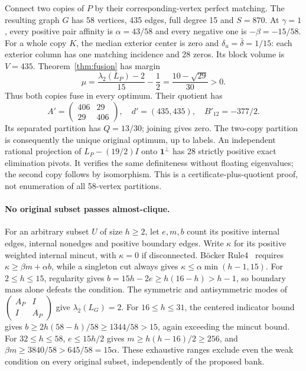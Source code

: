 \documentclass[sigconf,anonymous,review]{acmart}
\newcommand{\1}{\mathbf{1}}
\begin{document}
Connect two copies of $P$ by their corresponding-vertex perfect matching.
The resulting graph $G$ has 58 vertices, 435 edges, full degree 15 and
$S=870$. At $\gamma=1$, every positive pair affinity is
$\alpha=43/58$ and every negative one is $-\beta=-15/58$.
For a whole copy $K$, the median exterior center is zero and
$\delta_u=\bar\delta=1/15$: each exterior column has one matching incidence
and 28 zeros. Its block volume is $V=435$. Theorem~\ref{thm:fusion} has margin
\[
 \mu=\frac{\lambda_2(L_P)-2}{15}-\frac12
     =\frac{10-\sqrt{29}}{30}>0.
\]
Thus both copies fuse in every optimum. Their quotient has
\[
 A'=\begin{pmatrix}406&29\\29&406\end{pmatrix},\quad
 d'=(435,435),\quad B'_{12}=-377/2.
\]
Its separated partition has $Q=13/30$; joining gives zero. The two-copy
partition is consequently the unique original optimum, up to labels.
An independent rational projection of $L_P-(19/2)I$ onto $\1^\perp$
has 28 strictly positive exact elimination pivots. It verifies the same
definiteness without floating eigenvalues; the second copy follows by
isomorphism. This is a certificate-plus-quotient proof, not enumeration of
all 58-vertex partitions.

\paragraph{No original subset passes almost-clique.}
For an arbitrary subset $U$ of size $h\ge2$, let $e,m,b$ count its positive
internal edges, internal nonedges and positive boundary edges. Write
$\kappa$ for its positive weighted internal mincut, with $\kappa=0$ if
disconnected. B\"ocker Rule4~\cite{bocker2011exact} requires
$\kappa\ge\beta m+\alpha b$, while a singleton cut always gives
$\kappa\le\alpha\min(h-1,15)$.
For $2\le h\le15$, regularity gives
$b=15h-2e\ge h(16-h)>h-1$, so boundary mass alone defeats the condition.
The symmetric and antisymmetric modes of
$\left(\begin{smallmatrix}A_P&I\\I&A_P\end{smallmatrix}\right)$ give
$\lambda_2(L_G)=2$. For $16\le h\le31$, the centered indicator bound gives
$b\ge2h(58-h)/58\ge1344/58>15$, again exceeding the mincut bound.
For $32\le h\le58$, $e\le15h/2$ gives
$m\ge h(h-16)/2\ge256$, and
$\beta m\ge3840/58>645/58=15\alpha$.
These exhaustive ranges exclude even the weak condition on every original
subset, independently of the proposed bank.
\end{document}
